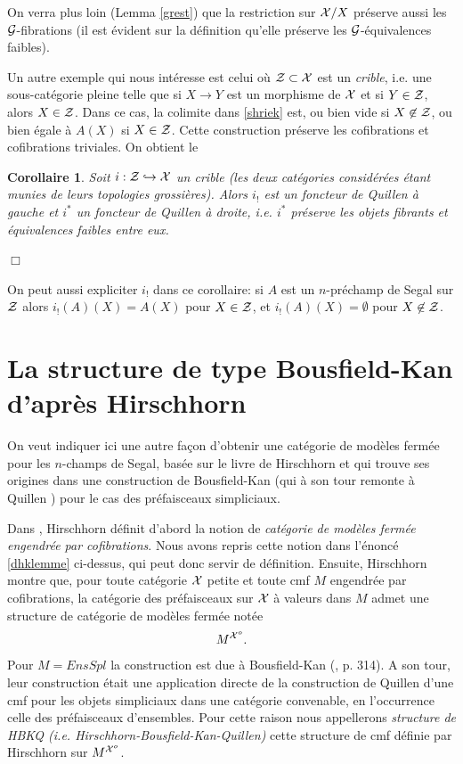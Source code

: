 \documentclass[12pt]{article}
\newcommand{\numero}[1]{\newpage\section{#1}}
\newcommand{\eop}{\hfill $\Box$\vspace{.1in}}
\newtheorem{corollaire}[lemma]{Corollaire}
\newcommand{\Gg}{{\cal G}}
\newcommand{\Xx}{{\cal X}}
\newcommand{\Zz}{{\cal Z}}
\begin{document}
On verra plus loin (Lemma \ref{grest}) que la restriction sur $\Xx /X$
pr\'eserve
aussi les $\Gg$-fibrations (il est \'evident sur la d\'efinition qu'elle
pr\'eserve les  $\Gg$-\'equivalences faibles).

Un autre exemple qui nous int\'eresse est celui o\`u $\Zz \subset \Xx$ est
un {\em
crible}, i.e. une sous-cat\'egorie pleine telle que si
$X\rightarrow Y$ est un morphisme de $\Xx$ et si $Y\in \Zz$, alors $X\in \Zz$.
Dans ce cas, la colimite dans \ref{shriek} est, ou bien vide si $X\not \in
\Zz$, ou bien \'egale \`a $A(X)$ si $X\in \Zz$. Cette
construction pr\'eserve les cofibrations
et cofibrations triviales. On obtient le

\begin{corollaire}
\label{crible}
Soit $i:\Zz \hookrightarrow \Xx$ un crible (les deux cat\'egories
consid\'er\'ees \'etant munies de leurs topologies grossi\`eres). Alors
$i_{!}$ est un
foncteur de Quillen \`a gauche et $i^{\ast}$ un foncteur de Quillen \`a droite,
i.e. $i^{\ast}$ pr\'eserve les objets fibrants et \'equivalences faibles
entre eux.
\end{corollaire}
\eop

On peut aussi expliciter $i_{!}$ dans ce corollaire: si $A$ est un
$n$-pr\'echamp
de Segal sur $\Zz$ alors $i_!(A)(X) = A(X)$ pour $X\in \Zz$, et
$i_!(A)(X) = \emptyset$ pour $X\not \in \Zz$.




\numero{La structure de type Bousfield-Kan d'apr\`es Hirschhorn}
\label{bousfieldkanpage}

On veut indiquer ici une autre fa\c{c}on d'obtenir une cat\'egorie de
mod\`eles ferm\'ee pour les $n$-champs de Segal, bas\'ee sur le livre de
Hirschhorn \cite{Hirschhorn} et qui trouve ses origines dans une construction
de Bousfield-Kan \cite{BousfieldKan} (qui \`a son tour remonte \`a Quillen
\cite{Quillen}) pour le cas des pr\'efaisceaux simpliciaux.

Dans \cite{Hirschhorn}, Hirschhorn d\'efinit d'abord la notion de {\em
cat\'egorie de mod\`eles ferm\'ee engendr\'ee par cofibrations}. Nous avons
repris cette notion dans l'\'enonc\'e \ref{dhklemme} ci-dessus, qui peut donc
servir de d\'efinition. Ensuite,
Hirschhorn montre que, pour toute cat\'egorie $\Xx$
petite et toute cmf $M$ engendr\'ee par
cofibrations, la cat\'egorie des
pr\'efaisceaux sur $\Xx$ \`a valeurs dans $M$ admet une structure de cat\'egorie
de mod\`eles ferm\'ee not\'ee
$$
M^{\Xx ^o}.
$$
Pour $M=EnsSpl$ la construction est due \`a Bousfield-Kan (\cite{BousfieldKan},
p. 314). A son tour, leur construction \'etait une application directe de la
construction de Quillen \cite{Quillen} d'une cmf pour les objets simpliciaux
dans une cat\'egorie convenable, en l'occurrence  celle des pr\'efaisceaux
d'ensembles. Pour cette raison nous appellerons {\em structure de HBKQ (i.e.
Hirschhorn-Bousfield-Kan-Quillen)} cette structure de cmf
d\'efinie par Hirschhorn sur $M^{\Xx ^o}$.
\end{document}

